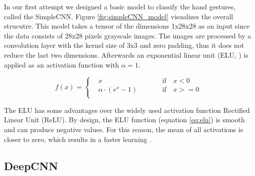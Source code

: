 \documentclass[a4paper]{article}
\begin{document}
In our first attempt we designed a basic model to classify the hand gestures, called the SimpleCNN. Figure \ref{fig:simpleCNN_model} visualizes the overall strucutre. This model takes a tensor of the dimensions 1x28x28 as an input since the data consists of 28x28 pixels grayscale images. The images are processed by a convolution layer with the kernel size of 3x3 and zero padding, thus it does not reduce the last two dimensions. Afterwards an exponential linear unit (ELU, \cite{clevert2015fast}) is applied as an activation function with $\alpha = 1$.
\vspace{-0.2cm}

\begin{equation}\label{eq:elu}
f(x) = \left\{\begin{alignedat}{2}
    & x && \qquad \text{if} \quad x < 0\\
    & \alpha \cdot (e^x - 1) && \qquad \text{if} \quad x >= 0\\
  \end{alignedat}\right.
\end{equation}

The ELU has some advantages over the widely used activation function Rectified Linear Unit (ReLU). By design, the ELU function (equation \ref{eq:elu}) is smooth and can produce negative values. For this reason, the mean of all activations is closer to zero, which results in a faster learning \cite{clever2015fast}.


\subsection{DeepCNN}\label{sec:deepCNN}
\end{document}
